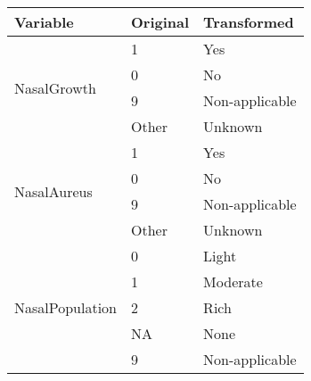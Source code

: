 \begin{table}[H]
	\centering

    \label{table:Table_SA_Transform_Categories}
    
	\renewcommand{\arraystretch}{1.5}

    \begin{tabular}{l | l | l}
		\hline
        \rowcolor[HTML]{FF9999}		
		
        \textbf{Variable} & \textbf{Original} & \textbf{Transformed} \\ 		
        
        \hline 

            \multirow{4}{*}{NasalGrowth} & \multicolumn{1}{l}{1}     & \multicolumn{1}{l}{Yes}            \\\cline{2-3}
                                         & \multicolumn{1}{l}{0}     & \multicolumn{1}{l}{No}             \\\cline{2-3}
                                         & \multicolumn{1}{l}{9}     & \multicolumn{1}{l}{Non-applicable} \\\cline{2-3}
                                         & \multicolumn{1}{l}{Other} & \multicolumn{1}{l}{Unknown}        \\\hline
                                    
            \multirow{4}{*}{NasalAureus} & \multicolumn{1}{l}{1}     & \multicolumn{1}{l}{Yes}            \\\cline{2-3}
                                         & \multicolumn{1}{l}{0}     & \multicolumn{1}{l}{No}             \\\cline{2-3}
                                         & \multicolumn{1}{l}{9}     & \multicolumn{1}{l}{Non-applicable} \\\cline{2-3}
                                         & \multicolumn{1}{l}{Other} & \multicolumn{1}{l}{Unknown}        \\\hline

            \multirow{5}{*}{NasalPopulation} & \multicolumn{1}{l}{0}  & \multicolumn{1}{l}{Light}          \\\cline{2-3}
                                             & \multicolumn{1}{l}{1}  & \multicolumn{1}{l}{Moderate}       \\\cline{2-3}
                                             & \multicolumn{1}{l}{2}  & \multicolumn{1}{l}{Rich}           \\\cline{2-3}
					                         & \multicolumn{1}{l}{NA} & \multicolumn{1}{l}{None}           \\\cline{2-3}
                                             & \multicolumn{1}{l}{9}  & \multicolumn{1}{l}{Non-applicable} \\\hline
                                             

\end{tabular}
\end{table}
